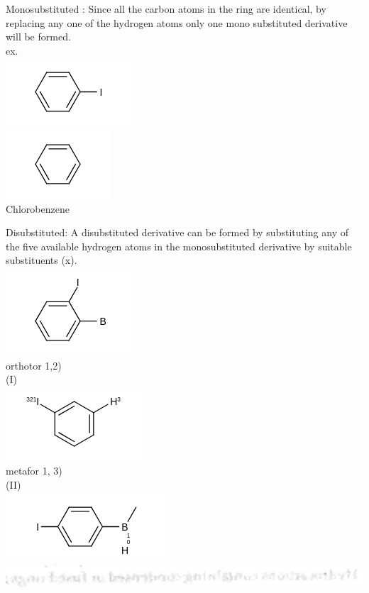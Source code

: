 \documentclass[10pt]{article}
\begin{document}
Monosubstituted : Since all the carbon atoms in the ring are identical, by replacing any one of the hydrogen atoms only one mono substituted derivative will be formed.\\
ex.\\
\includegraphics{smile-a71ecb7b356cbe2e47b86de13d3e6322ead4b000}\\
\includegraphics{smile-bd815f64dc01220d5305c390a17990d529271f4e}\\
Chlorobenzene

Disubstituted: A disubstituted derivative can be formed by substituting any of the five available hydrogen atoms in the monosubstituted derivative by suitable substituents (x).\\
\includegraphics{smile-6490568c402c33ecd50befabf24d3bb5ead738be}\\
orthotor 1,2)\\
(I)\\
\includegraphics{smile-cc2af68d49923d21c11ad36c6ce9e4153a05b019}\\
metafor 1, 3)\\
(II)\\
\includegraphics{smile-ca9aa843c6756d08d3e861260298d0ea69cbe6d2}\\
\includegraphics[max width=\textwidth, center]{2025_01_28_8470952b98110cec3aabg-027}
\end{document}
